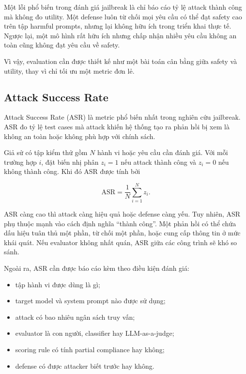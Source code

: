 Một lỗi phổ biến trong đánh giá jailbreak là chỉ báo cáo tỷ lệ attack
thành công mà không đo utility. Một defense luôn từ chối mọi yêu cầu có
thể đạt safety cao trên tập harmful prompts, nhưng lại không hữu ích trong
triển khai thực tế. Ngược lại, một mô hình rất hữu ích nhưng chấp nhận
nhiều yêu cầu không an toàn cũng không đạt yêu cầu về safety.

Vì vậy, evaluation cần được thiết kế như một bài toán cân bằng giữa
safety và utility, thay vì chỉ tối ưu một metric đơn lẻ.

\subsection{Attack Success Rate}
\label{subsec:attack-success-rate}

Attack Success Rate (ASR) là metric phổ biến nhất trong nghiên cứu
jailbreak. ASR đo tỷ lệ test cases mà attack khiến hệ thống tạo ra phản
hồi bị xem là không an toàn hoặc không phù hợp với chính sách.

Giả sử có tập kiểm thử gồm $N$ hành vi hoặc yêu cầu cần đánh giá. Với mỗi
trường hợp $i$, đặt biến nhị phân $z_i = 1$ nếu attack thành công và
$z_i = 0$ nếu không thành công. Khi đó ASR được tính bởi

\begin{equation}
    \mathrm{ASR}
    =
    \frac{1}{N}
    \sum_{i=1}^{N}
    z_i.
    \label{eq:attack-success-rate}
\end{equation}

ASR càng cao thì attack càng hiệu quả hoặc defense càng yếu. Tuy nhiên,
ASR phụ thuộc mạnh vào cách định nghĩa ``thành công''. Một phản hồi có
thể chứa dấu hiệu tuân thủ một phần, từ chối một phần, hoặc cung cấp thông
tin ở mức khái quát. Nếu evaluator không nhất quán, ASR giữa các công
trình sẽ khó so sánh.

Ngoài ra, ASR cần được báo cáo kèm theo điều kiện đánh giá:

\begin{itemize}[leftmargin=1.2cm]
    \item tập hành vi được dùng là gì;
    \item target model và system prompt nào được sử dụng;
    \item attack có bao nhiêu ngân sách truy vấn;
    \item evaluator là con người, classifier hay LLM-as-a-judge;
    \item scoring rule có tính partial compliance hay không;
    \item defense có được attacker biết trước hay không.
\end{itemize}

